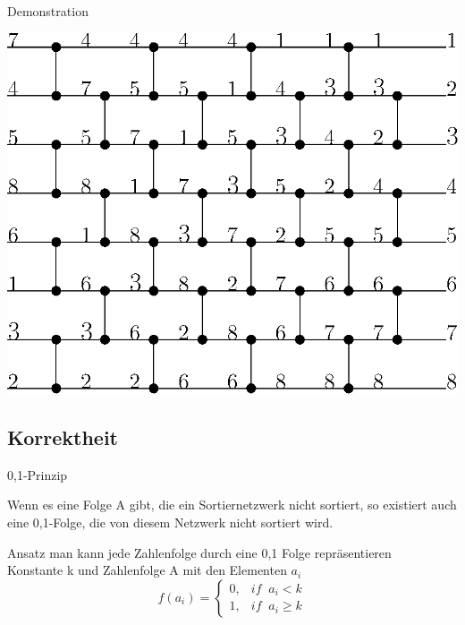 \documentclass[ucs,9pt]{beamer}
\begin{document}
\begin{frame}{Demonstration}
\begin{center}
   \includegraphics[scale=0.8]{bild2beispiel.eps}
  \end{center}
\end{frame}

\subsection{Korrektheit}
\begin{frame}{0,1-Prinzip}
\begin{center}
Wenn es eine Folge A gibt, die ein Sortiernetzwerk nicht sortiert, so existiert auch eine 0,1-Folge, die von diesem Netzwerk nicht sortiert wird.
\end{center}
\end{frame}

\begin{frame}{Ansatz}
    man kann jede Zahlenfolge durch eine 0,1 Folge repräsentieren\\
    Konstante k und Zahlenfolge A mit den Elementen $a_i$\\
    $$
    f(a_i) = \begin{cases} 0 , & if \;\;a_i < k \\
    1 , & if \;\;a_i \geq k
    \end{cases}$$
\end{frame}
\end{document}
